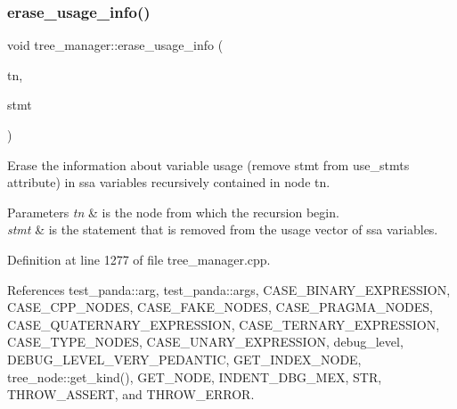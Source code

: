 \subsubsection{\texorpdfstring{erase\+\_\+usage\+\_\+info()}{erase\_usage\_info()}}
{\footnotesize\ttfamily void tree\+\_\+manager\+::erase\+\_\+usage\+\_\+info (\begin{DoxyParamCaption}\item[{const \hyperlink{tree__node_8hpp_a6ee377554d1c4871ad66a337eaa67fd5}{tree\+\_\+node\+Ref} \&}]{tn,  }\item[{const \hyperlink{tree__node_8hpp_a6ee377554d1c4871ad66a337eaa67fd5}{tree\+\_\+node\+Ref} \&}]{stmt }\end{DoxyParamCaption})\hspace{0.3cm}{\ttfamily [private]}}



Erase the information about variable usage (remove stmt from use\+\_\+stmts attribute) in ssa variables recursively contained in node tn. 


\begin{DoxyParams}{Parameters}
{\em tn} & is the node from which the recursion begin. \\
\hline
{\em stmt} & is the statement that is removed from the usage vector of ssa variables. \\
\hline
\end{DoxyParams}


Definition at line 1277 of file tree\+\_\+manager.\+cpp.



References test\+\_\+panda\+::arg, test\+\_\+panda\+::args, C\+A\+S\+E\+\_\+\+B\+I\+N\+A\+R\+Y\+\_\+\+E\+X\+P\+R\+E\+S\+S\+I\+ON, C\+A\+S\+E\+\_\+\+C\+P\+P\+\_\+\+N\+O\+D\+ES, C\+A\+S\+E\+\_\+\+F\+A\+K\+E\+\_\+\+N\+O\+D\+ES, C\+A\+S\+E\+\_\+\+P\+R\+A\+G\+M\+A\+\_\+\+N\+O\+D\+ES, C\+A\+S\+E\+\_\+\+Q\+U\+A\+T\+E\+R\+N\+A\+R\+Y\+\_\+\+E\+X\+P\+R\+E\+S\+S\+I\+ON, C\+A\+S\+E\+\_\+\+T\+E\+R\+N\+A\+R\+Y\+\_\+\+E\+X\+P\+R\+E\+S\+S\+I\+ON, C\+A\+S\+E\+\_\+\+T\+Y\+P\+E\+\_\+\+N\+O\+D\+ES, C\+A\+S\+E\+\_\+\+U\+N\+A\+R\+Y\+\_\+\+E\+X\+P\+R\+E\+S\+S\+I\+ON, debug\+\_\+level, D\+E\+B\+U\+G\+\_\+\+L\+E\+V\+E\+L\+\_\+\+V\+E\+R\+Y\+\_\+\+P\+E\+D\+A\+N\+T\+IC, G\+E\+T\+\_\+\+I\+N\+D\+E\+X\+\_\+\+N\+O\+DE, tree\+\_\+node\+::get\+\_\+kind(), G\+E\+T\+\_\+\+N\+O\+DE, I\+N\+D\+E\+N\+T\+\_\+\+D\+B\+G\+\_\+\+M\+EX, S\+TR, T\+H\+R\+O\+W\+\_\+\+A\+S\+S\+E\+RT, and T\+H\+R\+O\+W\+\_\+\+E\+R\+R\+OR.



